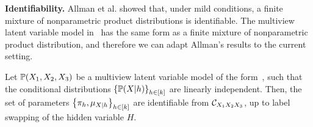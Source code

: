 \documentclass{article}
\begin{document}

{\bf Identifiability.} Allman et al. showed that, under mild conditions, a finite mixture of nonparametric product distributions is identifiable. The multiview latent variable model in~ has the same form as a finite mixture of nonparametric product distribution, and therefore we can adapt Allman's results to the current setting.
\begin{theorem}
  Let $\mathbb{P}(X_1,X_2,X_3)$ be a multiview latent variable model of the form~, such that the conditional distributions $\left\{\mathbb{P}(X|h)\right\}_{h \in [k]}$ are linearly independent. Then, the set of parameters $\left\{\pi_h, \mu_{X|h}\right\}_{h \in [k]}$ are identifiable from $\mathcal{C}_{X_1 X_2 X_3}$, up to label swapping of the hidden variable $H$.
\end{theorem}
\end{document}
